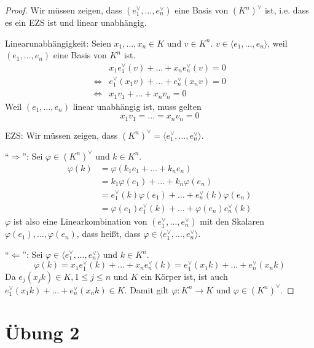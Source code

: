 \documentclass[a4paper,10pt]{article}
\begin{document}
\begin{proof}
 Wir müssen zeigen, dass $(e_1^\vee, \dots, e_n^\vee)$ eine Basis von $(K^n)^\vee$ ist, i.e. dass es ein EZS ist und linear unabhängig.
 
 Linearunabhängigkeit: Seien $x_1, \dots, x_n \in K$ und $v \in K^n$.
 $v \in \langle e_1, \dots, e_n \rangle$, weil $(e_1, \dots, e_n)$ eine Basis von $K^n$ ist.
 \begin{align}
  & x_1e_1^\vee(v) + \dots + x_ne_n^\vee(v) = 0\\
  \Leftrightarrow & e_1^\vee(x_1v) + \dots + e_n^\vee(x_nv) = 0\\
  \Leftrightarrow & x_1v_1 + \dots + x_nv_n = 0
 \end{align}
 Weil $(e_1, \dots, e_n)$ linear unabhängig ist, muss gelten
 \begin{equation}
  x_1v_1 = \dots = x_nv_n = 0
 \end{equation}

 EZS: Wir müssen zeigen, dass $(K^n)^\vee = \langle e_1^\vee, \dots, e_n^\vee \rangle$.
 
 ``$\Rightarrow$'': Sei $\varphi \in (K^n)^\vee$ und $k \in K^n$.
 \begin{align}
  \varphi(k) & = \varphi(k_1e_1 + \dots + k_ne_n)\\
  & = k_1\varphi(e_1) + \dots + k_n\varphi(e_n)\\
  & = e_1^\vee(k)\varphi(e_1) + \dots + e_n^\vee(k)\varphi(e_n)\\
  & = \varphi(e_1)e_1^\vee(k) + \dots + \varphi(e_n)e_n^\vee(k)
 \end{align}
 $\varphi$ ist also eine Linearkombination von $(e_1^\vee, \dots, e_n^\vee)$ mit den Skalaren $\varphi(e_1), \dots, \varphi(e_n)$, dass heißt, dass $\varphi \in \langle e_1^\vee, \dots, e_n^\vee \rangle$.
 
 ``$\Leftarrow$'': Sei $\varphi \in \langle e_1^\vee, \dots, e_n^\vee \rangle$ und $k \in K^n$.
 \begin{equation}
  \varphi(k) = x_1e_1^\vee(k) + \dots + x_ne_n^\vee(k) = e_1^\vee(x_1k) + \dots + e_n^\vee(x_nk)
 \end{equation}
 Da $e_j(x_jk) \in K, 1 \le j \le n$ und $K$ ein Körper ist, ist auch $e_1^\vee(x_1k) + \dots + e_n^\vee(x_nk) \in K$.
 Damit gilt $\varphi: K^n \rightarrow K$ und $\varphi \in (K^n)^\vee$.
\end{proof}

\section*{Übung 2}
\end{document}
